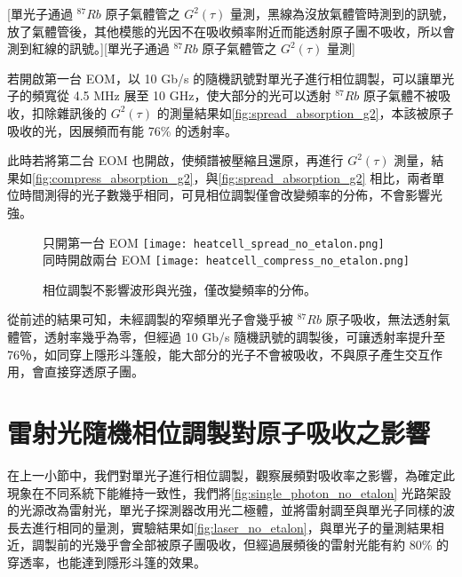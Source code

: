 \documentclass[class=NCU_thesis, crop=false]{standalone}
\begin{document}
[單光子通過 $^{87}Rb$ 原子氣體管之 $G^{2}(\tau)$ 量測，黑線為沒放氣體管時測到的訊號，放了氣體管後，其他模態的光因不在吸收頻率附近而能透射原子團不吸收，所以會測到紅線的訊號。][單光子通過 $^{87}Rb$ 原子氣體管之 $G^{2}(\tau)$ 量測]

若開啟第一台 EOM，以 10 Gb/s 的隨機訊號對單光子進行相位調製，可以讓單光子的頻寬從 4.5 MHz 展至 10 GHz，使大部分的光可以透射 $^{87}Rb$ 原子氣體不被吸收，扣除雜訊後的 $G^2(\tau)$ 的測量結果如\cref{fig:spread_absorption_g2}，本該被原子吸收的光，因展頻而有能 76\% 的透射率。

此時若將第二台 EOM 也開啟，使頻譜被壓縮且還原，再進行 $G^2(\tau)$ 測量，結果如\cref{fig:compress_absorption_g2}，與\cref{fig:spread_absorption_g2} 相比，兩者單位時間測得的光子數幾乎相同，可見相位調製僅會改變頻率的分佈，不會影響光強。


\begin{figure}[!hbt]
    \centering
    \subcaptionbox
        {只開第一台 EOM
        \label{fig:spread_absorption_g2}}
        {\texttt{[image: heatcell\_spread\_no\_etalon.png]}}
    ~~~~
    \subcaptionbox
        {同時開啟兩台 EOM
        \label{fig:compress_absorption_g2}}
        {\texttt{[image: heatcell\_compress\_no\_etalon.png]}}
    \caption{相位調製不影響波形與光強，僅改變頻率的分佈。}
    \label{fig:spread_or_not}
\end{figure}

從前述的結果可知，未經調製的窄頻單光子會幾乎被 $^{87}Rb$ 原子吸收，無法透射氣體管，透射率幾乎為零，但經過 10 Gb/s 隨機訊號的調製後，可讓透射率提升至 76％，如同穿上隱形斗篷般，能大部分的光子不會被吸收，不與原子產生交互作用，會直接穿透原子團。

\section{雷射光隨機相位調製對原子吸收之影響}
在上一小節中，我們對單光子進行相位調製，觀察展頻對吸收率之影響，為確定此現象在不同系統下能維持一致性，我們將\cref{fig:single_photon_no_etalon} 光路架設的光源改為雷射光，單光子探測器改用光二極體，並將雷射調至與單光子同樣的波長去進行相同的量測，實驗結果如\cref{fig:laser_no_etalon}，與單光子的量測結果相近，調製前的光幾乎會全部被原子團吸收，但經過展頻後的雷射光能有約 80\% 的穿透率，也能達到隱形斗篷的效果。
\end{document}
